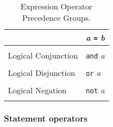 \begin{table}[htbp]
\begin{tabular}{ll}
                         &\textit{a} \texttt{=} \textit{b}    \\
[1ex]\hline\\[-1.5ex]
Logical Conjunction      &\texttt{and} \textit{a}             \\
[1ex]\hline\\[-1.5ex]
Logical Disjunction      &\texttt{or} \textit{a}              \\
[1ex]\hline\\[-1.5ex]
Logical Negation         &\texttt{not} \textit{a}             \\
[1ex]\hline\\[-1.5ex]
\end{tabular}
\label{611a28d0-3a66-4073-a89c-0b9a0b50a646}
\caption{Expression Operator Precedence Groups.}
\end{table}

\subsubsection{Statement operators}
